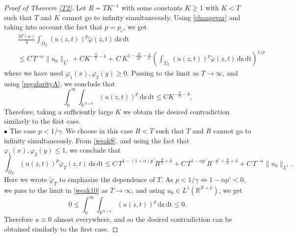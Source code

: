 \documentclass[10pt,a4paper]{amsart}
\def\R{{\mathbb {R}}}
\begin{document}
\begin{proof}[Proof of Theorem \ref{T2}]
	Let $R=TK^{-1}$ with some constants $K\ge 1$ with $K<T$ such that $T$ and $K$ cannot go to infinity simultaneously. Using \eqref{changevar} and taking into account the fact that $p=p_c$, we get
	\begin{eqnarray*}
		&{}&\frac{3\Gamma(\alpha)}{4}\int_{\Omega_T}(u(z,t))^{p}\widetilde{\varphi}(z,t)\,\mathrm{dz}\,\mathrm{dt}\\
		&{}&\leq C\,T^{-\alpha}\|u_0\|_{L^1}+CK^{-\frac{N}{2}-k} +\,C\,K^{1-\frac{N}{2p'}-\frac{k}{p'}}\left(\int_{\Sigma_T}(u(z,t))^{p}\widetilde{\varphi}(z,t)\,\mathrm{dz}\,\mathrm{dt}\right)^{1/p}
	\end{eqnarray*}
	where we have used $\varphi_1(x),\varphi_2(y)\geq 0$. Passing to the limit as $T\rightarrow\infty$, and using \eqref{regularityA}, we conclude that
	$$\int_0^\infty\int_{\R^{N+k}}(u(z,t))^{p}\,\mathrm{dz}\,\mathrm{dt}\leq CK^{-\frac{N}{2}-k}.$$
	Therefore, taking a sufficiently large $K$ we obtain the desired contradiction similarly to the first case.\\
	
	\noindent $\bullet$ The case $p<1/\gamma$. We choose in this case $R<T$ such that $T$ and $R$ cannot go to infinity simultaneously. From \eqref{weak8}, and using the fact that $\varphi_1(x),\varphi_2(y)\leq 1$, we conclude that
	\begin{equation}\label{weak10}
		\int_{\Omega_T}(u(z,t))^{p}\widetilde{\varphi}_T(z,t)\,\mathrm{dz}\,\mathrm{dt}\leq C\,T^{1-(1+\alpha)p'}R^{\frac{N}{2}+k}+C\,T^{1-\alpha p'}R^{-p'+\frac{N}{2}+k}+C\,T^{-\alpha}\|u_0\|_{L^1}.
	\end{equation}
	Here we wrote $\widetilde{\varphi}_T$ to emphasize the dependence of $T$. As $p<1/\gamma\Longleftrightarrow 1-\alpha p'<0$, we pass to the limit in \eqref{weak10} as $T\rightarrow\infty$, and using $u_0\in L^1(\mathbb{R}^{N+k})$, we get
	$$0\leq \int_0^\infty\int_{\R^{N+k}}(u(z,t))^{p}\,\mathrm{dz}\,\mathrm{dt}\leq 0.$$
	Therefore $u\equiv 0$ almost everywhere, and so the desired contradiction can be obtained similarly to the first case.
\end{proof}
\end{document}
